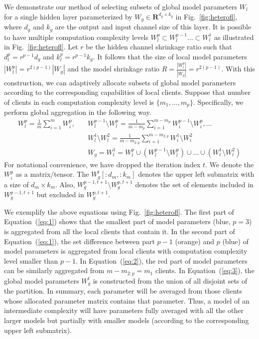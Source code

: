 \documentclass{article} %
\begin{document}
We demonstrate our method of selecting subsets of global model parameters $W_l$ for a single hidden layer parameterized by $W_g \in \mathbf{R}^{d_g \times k_g}$ in Fig.~\ref{fig:heterofl}, where $d_g$ and $k_g$ are the output and input channel size of this layer. It is possible to have multiple computation complexity levels $W_l^p \subset W_l^{p-1} \dots \subset W_l^1$ as illustrated in Fig.~\ref{fig:heterofl}. Let $r$ be the hidden channel shrinkage ratio such that $d_l^p = r^{p-1}d_g$ and $k_l^p = r^{p-1}k_g$. It follows that the size of local model parameters $|W_l^p| = r^{2(p-1)}|W_g|$ and the model shrinkage ratio $R = \frac{|W_l^p|}{|W_g|} = r^{2(p-1)}$. With this construction, we can adaptively allocate subsets of global model parameters according to the corresponding capabilities of local clients. 
Suppose that number of clients in each computation complexity level is $\{m_1,\dots, m_p\}$. 
Specifically, we perform global aggregation in the following way.
\begin{align}
    W_l^{p} = \frac{1}{m}\sum_{i=1}^{m} W_i^{p}, \quad &W_l^{p-1} \setminus W_l^{p} = \frac{1}{m-m_p} \sum_{i=1}^{m-m_p} W_i^{p-1} \setminus  W_i^{p}, \dots \label{eq:1}\\
    &W_l^{1} \setminus W_l^{2} = \frac{1}{m-m_{2:p}} \sum_{i=1}^{m-m_{2:p}} W_i^{1} \setminus  W_i^{2} \label{eq:2}\\
    &W_g = W_l^{1} = W_l^{p} \cup (W_l^{p-1} \setminus  W_l^{p}) \cup \dots \cup (W_l^{1} \setminus  W_l^{2}) \label{eq:3}
\end{align}
For notational convenience, we have dropped the iteration index $t$. 
We denote the $W_i^p$ as a matrix/tensor. The $W^t_g[:d_m,:k_m]$ denotes the upper left submatrix with a size of $d_m \times k_m$. 
Also, $W^{p-1,t+1}_g \setminus W^{p,t+1}_g$ denotes the set of elements included in $W^{p-1,t+1}_g$ but excluded in $ W^{p,t+1}_g$.

We exemplify the above equations using Fig.~\ref{fig:heterofl}. The first part of Equation~(\ref{eq:1}) shows that the smallest part of model parameters (blue, $p=3$) is aggregated from all the local clients that contain it. In the second part of Equation~(\ref{eq:1}), the set difference between part $p-1$ (orange) and $p$ (blue) of model parameters is aggregated from local clients with computation complexity level smaller than $p-1$. In Equation~(\ref{eq:2}), the red part of model parameters can be similarly aggregated from $m-m_{2:p} = m_1$ clients. In Equation~(\ref{eq:3}), the global model parameters $W_g^t$ is constructed from the union of all disjoint sets of the partition. In summary, each parameter will be averaged from those clients whose allocated parameter matrix contains that parameter. Thus, a model of an intermediate complexity will have parameters fully averaged with all the other larger models but partially with smaller models (according to the corresponding upper left submatrix).
\end{document}

